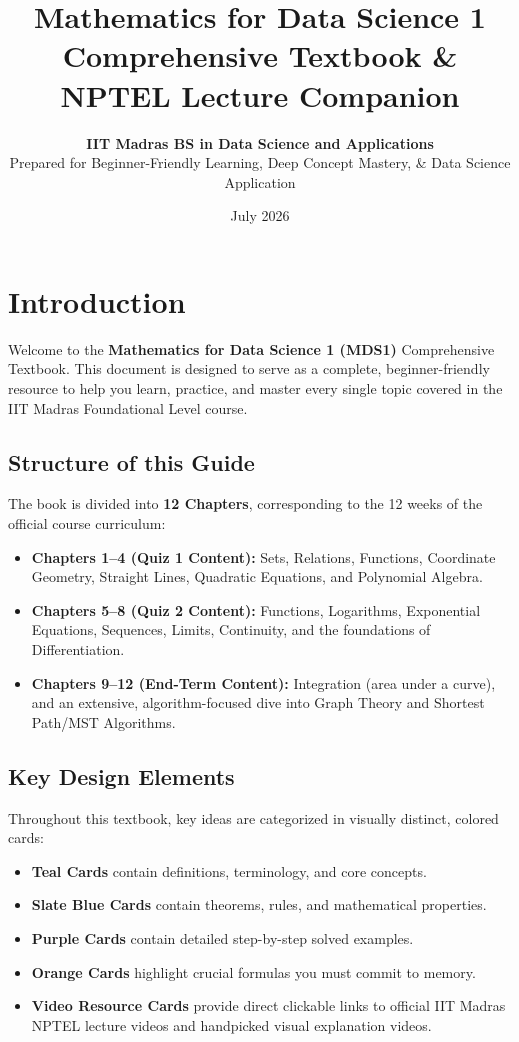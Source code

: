 \documentclass[11pt,a4paper,oneside]{book}
\title{
    \Huge \bfseries \sffamily \color{primarydark} Mathematics for Data Science 1 \\
    \large \vspace{0.3cm} \color{tealdef} Comprehensive Textbook \& NPTEL Lecture Companion
}
\author{
    \textbf{IIT Madras BS in Data Science and Applications} \\
    \small Prepared for Beginner-Friendly Learning, Deep Concept Mastery, \& Data Science Application
}
\date{July 2026}
\begin{document}
\maketitle

\frontmatter
\tableofcontents
\newpage

\chapter*{Introduction}

Welcome to the \textbf{Mathematics for Data Science 1 (MDS1)} Comprehensive Textbook. This document is designed to serve as a complete, beginner-friendly resource to help you learn, practice, and master every single topic covered in the IIT Madras Foundational Level course.

\section*{Structure of this Guide}
The book is divided into \textbf{12 Chapters}, corresponding to the 12 weeks of the official course curriculum:
\begin{itemize}
    \item \textbf{Chapters 1--4 (Quiz 1 Content):} Sets, Relations, Functions, Coordinate Geometry, Straight Lines, Quadratic Equations, and Polynomial Algebra.
    \item \textbf{Chapters 5--8 (Quiz 2 Content):} Functions, Logarithms, Exponential Equations, Sequences, Limits, Continuity, and the foundations of Differentiation.
    \item \textbf{Chapters 9--12 (End-Term Content):} Integration (area under a curve), and an extensive, algorithm-focused dive into Graph Theory and Shortest Path/MST Algorithms.
\end{itemize}

\section*{Key Design Elements}
Throughout this textbook, key ideas are categorized in visually distinct, colored cards:
\begin{itemize}
    \item \textcolor{tealdef}{\textbf{Teal Cards}} contain definitions, terminology, and core concepts.
    \item \textcolor{primaryborder}{\textbf{Slate Blue Cards}} contain theorems, rules, and mathematical properties.
    \item \textcolor{purpleex}{\textbf{Purple Cards}} contain detailed step-by-step solved examples.
    \item \textcolor{coralformula}{\textbf{Orange Cards}} highlight crucial formulas you must commit to memory.
    \item \textcolor{yttext}{\textbf{Video Resource Cards}} provide direct clickable links to official IIT Madras NPTEL lecture videos and handpicked visual explanation videos.
\end{itemize}
\end{document}
